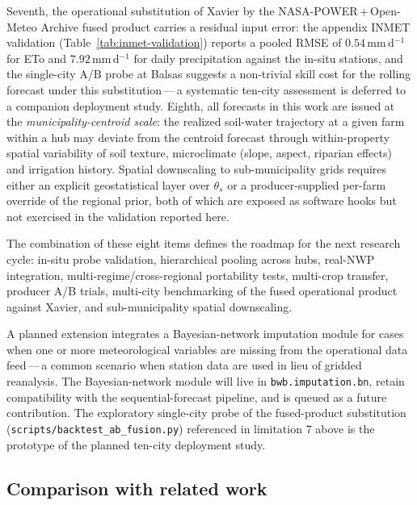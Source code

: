 \documentclass[review,5p,times]{elsarticle}
\begin{document}
Seventh, the operational substitution of Xavier by the
NASA-POWER\,+\,Open-Meteo Archive fused product carries a residual
input error: the appendix INMET validation
(Table~\ref{tab:inmet-validation}) reports a pooled RMSE of
$0.54$\,mm\,d$^{-1}$ for ETo and $7.92$\,mm\,d$^{-1}$ for daily
precipitation against the in-situ stations, and the single-city A/B
probe at Balsas
suggests a non-trivial skill cost for the rolling forecast under
this substitution\,---\,a systematic ten-city assessment is
deferred to a companion deployment study. Eighth, all forecasts in
this work are issued at the \emph{municipality-centroid scale}: the
realized soil-water trajectory at a given farm within a hub may
deviate from the centroid forecast through within-property
spatial variability of soil texture, microclimate (slope,
aspect, riparian effects) and irrigation history. Spatial
downscaling to sub-municipality grids requires either an explicit
geostatistical layer over $\theta_s$ or a producer-supplied per-farm
override of the regional prior, both of which are exposed as
software hooks but not exercised in the validation reported here.

The combination of these eight items defines the roadmap for the
next research cycle: in-situ probe validation, hierarchical pooling
across hubs, real-NWP integration, multi-regime/cross-regional
portability tests, multi-crop transfer, producer A/B trials,
multi-city benchmarking of the fused operational product against
Xavier, and sub-municipality spatial downscaling.

A planned extension integrates a Bayesian-network imputation module
\cite{Ribeiro2023} for cases when one or more meteorological
variables are missing from the operational data feed\,---\,a
common scenario when station data are used in lieu of gridded
reanalysis. The Bayesian-network module will live in
\texttt{bwb.imputation.bn}, retain compatibility with the
sequential-forecast pipeline, and is queued as a future contribution.
The exploratory single-city probe of the fused-product substitution
(\verb|scripts/backtest_ab_fusion.py|) referenced in limitation 7
above is the prototype of the planned ten-city deployment study.

\subsection{Comparison with related work}
\end{document}
